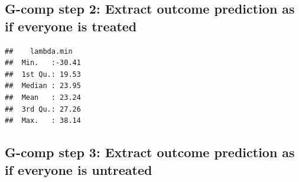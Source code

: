 \documentclass[
]{book}
\newenvironment{Shaded}{\begin{snugshade}}{\end{snugshade}}
\newcommand{\AttributeTok}[1]{\textcolor[rgb]{0.77,0.63,0.00}{#1}}
\newcommand{\ConstantTok}[1]{\textcolor[rgb]{0.00,0.00,0.00}{#1}}
\newcommand{\DecValTok}[1]{\textcolor[rgb]{0.00,0.00,0.81}{#1}}
\newcommand{\FunctionTok}[1]{\textcolor[rgb]{0.00,0.00,0.00}{#1}}
\newcommand{\NormalTok}[1]{#1}
\newcommand{\OtherTok}[1]{\textcolor[rgb]{0.56,0.35,0.01}{#1}}
\newcommand{\SpecialCharTok}[1]{\textcolor[rgb]{0.00,0.00,0.00}{#1}}
\newcommand{\StringTok}[1]{\textcolor[rgb]{0.31,0.60,0.02}{#1}}
\begin{document}
\begin{Shaded}
\end{Shaded}

\hypertarget{g-comp-step-2-extract-outcome-prediction-as-if-everyone-is-treated-1}{%
\subsection{G-comp step 2: Extract outcome prediction as if everyone is treated}\label{g-comp-step-2-extract-outcome-prediction-as-if-everyone-is-treated-1}}

\begin{Shaded}
\end{Shaded}

\begin{verbatim}
##    lambda.min    
##  Min.   :-30.41  
##  1st Qu.: 19.53  
##  Median : 23.95  
##  Mean   : 23.24  
##  3rd Qu.: 27.26  
##  Max.   : 38.14
\end{verbatim}

\hypertarget{g-comp-step-3-extract-outcome-prediction-as-if-everyone-is-untreated-1}{%
\subsection{G-comp step 3: Extract outcome prediction as if everyone is untreated}\label{g-comp-step-3-extract-outcome-prediction-as-if-everyone-is-untreated-1}}
\end{document}
